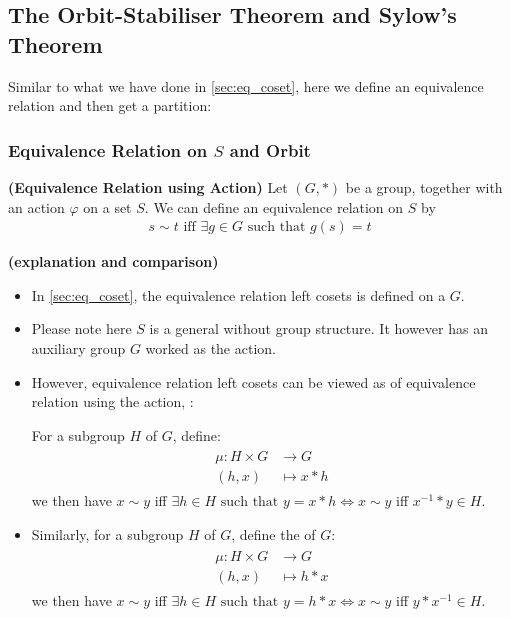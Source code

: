 \documentclass{article}
\newcommand{\bfs}[1]{\textbf{({#1}) }}
\begin{document}
\subsection{The Orbit-Stabiliser Theorem and Sylow's Theorem}
Similar to what we have done in \cref{sec:eq_coset}, here we define an equivalence relation and then get a partition:
\subsubsection{Equivalence Relation on $S$ and Orbit}
\begin{defa}{\bfs{Equivalence Relation using Action}}
   Let $(G, *)$ be a group, together with an action $\varphi$ on a set $S .$ We can define an equivalence relation on $S$ by
\begin{align*}
s \sim t \text{ iff } \exists g \in G \text { such that } g(s)=t
\end{align*}
\end{defa}
\begin{rema}{\bfs{explanation and comparison}}\label{rema:act_eq_exp}
\begin{itemize}
    \item In \cref{sec:eq_coset}, the  equivalence relation left cosets is defined on a  $G$.
    \item  Please note here $S$ is a general  without group structure. It however has an auxiliary group $G$ worked as the action.
    \item However, equivalence relation left cosets can be viewed as  of equivalence relation using the action, :
    
    For a subgroup $H$ of $G$, define:
\begin{align*}
\begin{aligned}
\mu: H \times G & \rightarrow G \\
(h, x) & \mapsto x*h
\end{aligned}
\end{align*}
 we then have $x\sim y$ iff $\exists h \in H \text { such that } y=x*h\Leftrightarrow   x\sim y$ iff $x^{-1}*y\in H$.
\item   Similarly,  for a subgroup $H$ of $G$, define the  of $G$:
\begin{align*}
\begin{aligned}
\mu: H \times G & \rightarrow G \\
(h, x) & \mapsto h*x
\end{aligned}
\end{align*}
 we then have $x\sim y$ iff $\exists h \in H \text { such that } y=h*x\Leftrightarrow   x\sim y$ iff $y*x^{-1}\in H$.

\end{itemize}
\end{rema}
\end{document}
